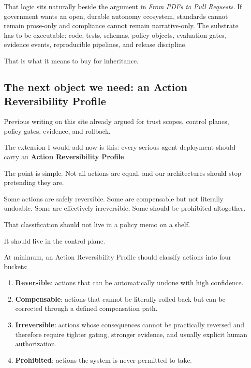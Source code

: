 \documentclass[11pt]{article}
\begin{document}
That logic sits naturally beside the argument in \emph{From PDFs to Pull
Requests}. If government wants an open, durable autonomy ecosystem,
standards cannot remain prose-only and compliance cannot remain
narrative-only. The substrate has to be executable: code, tests,
schemas, policy objects, evaluation gates, evidence events, reproducible
pipelines, and release discipline.

That is what it means to buy for inheritance.

\hypertarget{the-next-object-we-need-an-action-reversibility-profile}{%
\subsection{The next object we need: an Action Reversibility
Profile}\label{the-next-object-we-need-an-action-reversibility-profile}}

Previous writing on this site already argued for trust scopes, control
planes, policy gates, evidence, and rollback.

The extension I would add now is this: every serious agent deployment
should carry an \textbf{Action Reversibility Profile}.

The point is simple. Not all actions are equal, and our architectures
should stop pretending they are.

Some actions are safely reversible. Some are compensable but not
literally undoable. Some are effectively irreversible. Some should be
prohibited altogether.

That classification should not live in a policy memo on a shelf.

It should live in the control plane.

At minimum, an Action Reversibility Profile should classify actions into
four buckets:

\begin{enumerate}
\def\labelenumi{\arabic{enumi}.}
\tightlist
\item
  \textbf{Reversible}: actions that can be automatically undone with
  high confidence.
\item
  \textbf{Compensable}: actions that cannot be literally rolled back but
  can be corrected through a defined compensation path.
\item
  \textbf{Irreversible}: actions whose consequences cannot be
  practically reversed and therefore require tighter gating, stronger
  evidence, and usually explicit human authorization.
\item
  \textbf{Prohibited}: actions the system is never permitted to take.
\end{enumerate}
\end{document}
